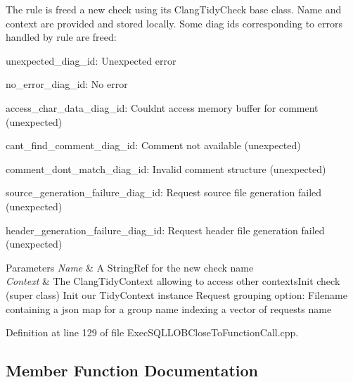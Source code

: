 The rule is freed a new check using its {\ttfamily Clang\+Tidy\+Check} base class. Name and context are provided and stored locally. Some diag ids corresponding to errors handled by rule are freed\+:
\begin{DoxyItemize}
\item unexpected\+\_\+diag\+\_\+id\+: Unexpected error
\item no\+\_\+error\+\_\+diag\+\_\+id\+: No error
\item access\+\_\+char\+\_\+data\+\_\+diag\+\_\+id\+: Couldn\textquotesingle{}t access memory buffer for comment (unexpected)
\item cant\+\_\+find\+\_\+comment\+\_\+diag\+\_\+id\+: Comment not available (unexpected)
\item comment\+\_\+dont\+\_\+match\+\_\+diag\+\_\+id\+: Invalid comment structure (unexpected)
\item source\+\_\+generation\+\_\+failure\+\_\+diag\+\_\+id\+: Request source file generation failed (unexpected)
\item header\+\_\+generation\+\_\+failure\+\_\+diag\+\_\+id\+: Request header file generation failed (unexpected)
\end{DoxyItemize}


\begin{DoxyParams}{Parameters}
{\em Name} & A String\+Ref for the new check name \\
\hline
{\em Context} & The Clang\+Tidy\+Context allowing to access other contexts\+Init check (super class) Init our Tidy\+Context instance Request grouping option\+: Filename containing a json map for a group name indexing a vector of requests name \\
\hline
\end{DoxyParams}


Definition at line 129 of file Exec\+S\+Q\+L\+L\+O\+B\+Close\+To\+Function\+Call.\+cpp.



\subsection{Member Function Documentation}
\mbox{\label{classclang_1_1tidy_1_1pagesjaunes_1_1_exec_s_q_l_l_o_b_close_to_function_call_a14cb29875129667687b1b4016d82399d}} 
